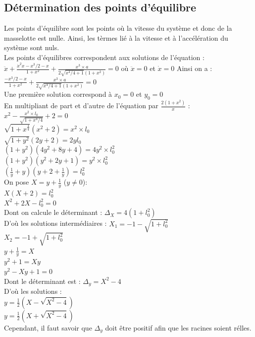 \documentclass[10pt,a4paper]{article}
\begin{document}
\subsection{Détermination des points d'équilibre}

Les points d'équilibre sont les points où la vitesse du système et donc de la masselotte est nulle. Ainsi, les tèrmes lié à la vitesse et à l'accélération du système sont nuls.\\
Les points d'équilibres correspondent aux solutions de l'équation :\\
$ \ddot{x}+\frac{\dot{x}^2x-x^3/2-x}{1+x^2}+\frac{x^3\times a}{2\sqrt{x^4/4+1}(1+x^2)}=0 $
où 
$\ddot{x}=0$ et $\dot{x}=0$
Ainsi on a :\\
$\frac{-x^3/2-x}{1+x^2} + \frac{x^3\times a}{2\sqrt{x^4/4+1}(1+x^2)}=0$ \\
Une première solution correspond à $x_0=0$ et $y_0=0$ \\
En multipliant de part et d'autre de l'équation par $\frac{2(1+x^2)}{x}$ :\\
$x^2-\frac{x^2\times l_0}{\sqrt{1+x^4/4}}+2=0$\\
$\sqrt{1+x^\frac{4}{4}}(x^2+2)=x^2\times l_0$\\
$\sqrt{1+y^2}(2y+2)=2yl_0$\\
$(1+y^2)(4y^2+8y+4)=4y^2\times l_0^2$\\
$(1+y^2)(y^2+2y+1)=y^2\times l_0^2$\\
$(\frac{1}{y}+y)(y+2+\frac{1}{y})=l_0^2$\\
On pose $X=y+\frac{1}{y}$ ($y\neq 0$):\\
$X(X+2)=l_0^2$\\
$X^2+2X-l_0^2=0$\\
Dont on calcule le déterminant :
$\Delta_X=4(1+l_0^2)$\\
D'où les solutions intermédiaires :
$X_1=-1-\sqrt{1+l_0^2}$\\
$X_2=-1+\sqrt{1+l_0^2}$\\
$y+\frac{1}{y}=X$\\
$y^2+1=Xy$\\
$y^2-Xy+1=0$\\
Dont le déterminant est :
$\Delta_y=X^2-4$\\
D'où les solutions :\\
$y=\frac{1}{2}(X-\sqrt{X^2-4})$\\
$y=\frac{1}{2}(X+\sqrt{X^2-4})$\\
Cependant, il faut savoir que $\Delta_y$ doit être positif afin que les racines soient rélles.\\
\end{document}
